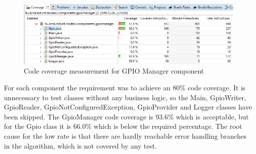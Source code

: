 \begin{figure}[ht]
	\centering
	\includegraphics[width=150mm, keepaspectratio]{figures/impl/gpioCoverage.png}
	\caption{Code coverage measurement for GPIO Manager component}
	\label{fig:gpiomanagerCoverage}
\end{figure}
For each component the requirement was to achieve an 80\% code coverage. It is unnecessary to test classes without any business logic, so the Main, GpioWriter, GpioReader, GpioNotConfiguredException, GpioProvider and Logger classes have been skipped. The GpioManager code coverage is 93.6\% which is acceptable, but for the Gpio class it is 66.0\% which is below the required percentage. The root cause for the low rate is that there are hardly reachable error handling branches in the algorithm, which is not covered by any test.

